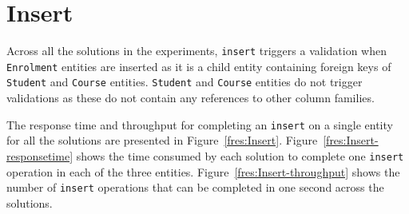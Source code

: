 \section{Insert} \label{s:results-insert}
Across all the solutions in the experiments,  \texttt{insert}  triggers a
validation when \texttt{Enrolment} entities are inserted as it is a child entity
containing foreign keys of \texttt{Student} and \texttt{Course} entities.
\texttt{Student} and \texttt{Course} entities do not trigger validations as
these do not contain any references to other column families. 

The response time and throughput for completing an \texttt{insert} on a single
entity for all the solutions are presented in Figure~\ref{fres:Insert}.
Figure~\ref{fres:Insert-responsetime} shows the time consumed by each solution
to complete one \texttt{insert} operation in each of the three entities.
Figure~\ref{fres:Insert-throughput} shows the number of \texttt{insert}
operations that can be completed in one second across the solutions.

